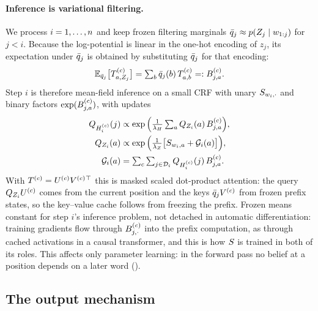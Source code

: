 \paragraph{Inference is variational filtering.}
We process $i = 1,\dots,n$ and keep frozen filtering marginals
$\bar{q}_{j} \approx p(Z_{j} \mid w_{1:j})$ for $j<i$. Because the log-potential is linear in the
one-hot encoding of $z_j$, its expectation under $\bar{q}_{j}$ is obtained by substituting
$\bar{q}_{j}$ for that encoding:
%
\begin{equation}
\label{eq:contract}
  \mathbb{E}_{\bar{q}_{j}}\big[T^{(c)}_{a,Z_{j}}\big]
    = \textstyle\sum_b \bar{q}_{j}(b)\, T^{(c)}_{a,b} =: B^{(c)}_{j,a}.
\end{equation}
%
Step $i$ is therefore mean-field inference on a small CRF with unary $S_{w_i,\cdot}$
and binary factors $\exp(B^{(c)}_{j,a})$, with updates
%
\begin{align}
\label{eq:update-H}
  Q_{H_{i}^{(c)}}(j) &\propto \exp\Big(\tfrac{1}{\lambda_H}\textstyle\sum_a Q_{Z_{i}}(a)\, B^{(c)}_{j,a}\Big),\\
\label{eq:update-Z}
  Q_{Z_{i}}(a) &\propto \exp\Big(\tfrac{1}{\lambda_Z}\big[S_{w_i,a} + \mathcal{G}_i(a)\big]\Big),
  \nonumber\\
  \mathcal{G}_i(a) &= \textstyle\sum_c\sum_{j\in\mathcal{D}_{i}} Q_{H_{i}^{(c)}}(j)\, B^{(c)}_{j,a}.
\end{align}
%
With $T^{(c)}=U^{(c)}V^{(c)}{}^{\top}$ this is masked scaled dot-product attention: the query
$Q_{Z_{i}}U^{(c)}$ comes from the current position and the keys $\bar{q}_{j}V^{(c)}$ from frozen
prefix states, so the key--value cache follows from freezing the prefix. Frozen means constant
for step $i$'s inference problem, not detached in automatic differentiation: training gradients
flow through $B^{(c)}_{j,\cdot}$ into the prefix computation, as through cached activations in
a causal transformer, and this is how $S$ is trained in both of its roles. This affects only
parameter learning: in the forward pass no belief at a position depends on a later word
().

\subsection{The output mechanism}
\label{sec:output}

